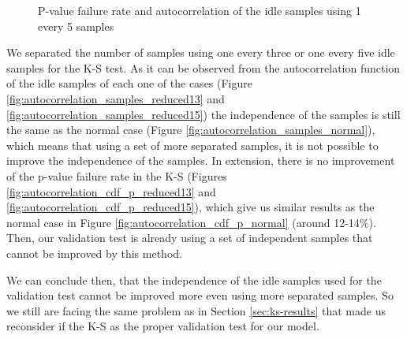 \begin{figure}[h!]
	\centering
	\caption{P-value failure rate and autocorrelation of the idle samples using 1 every 5 samples}
	\label{fig:autocorrelation_idle_reduced15}
\end{figure}

We separated the number of samples using one every three or one every five idle samples for the \acs{K-S} test. As it can be observed from the autocorrelation function of the idle samples of each one of the cases (Figure \ref{fig:autocorrelation_samples_reduced13} and \ref{fig:autocorrelation_samples_reduced15}) the independence of the samples is still the same as the normal case (Figure \ref{fig:autocorrelation_samples_normal}), which means that using a set of more separated samples, it is not possible to improve the independence of the samples. In extension, there is no improvement of the p-value failure rate in the \acs{K-S} (Figures \ref{fig:autocorrelation_cdf_p_reduced13} and \ref{fig:autocorrelation_cdf_p_reduced15}), which give us similar results as the normal case in Figure \ref{fig:autocorrelation_cdf_p_normal} (around 12-14\%). Then, our validation test is already using a set of independent samples that cannot be improved by this method.

We can conclude then, that the independence of the idle samples used for the validation test cannot be improved more even using more separated samples. So we still are facing the same problem as in Section \ref{sec:ks-results} that made us reconsider if the \acs{K-S} as the proper validation test for our model.

